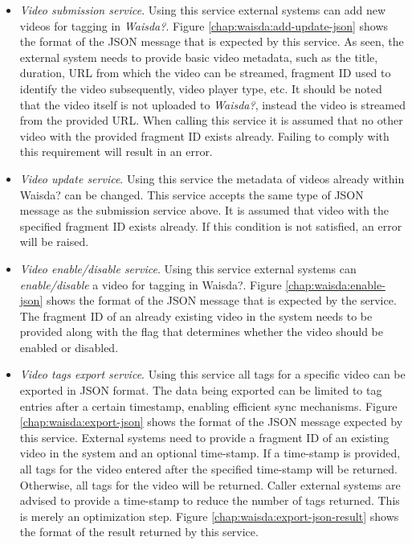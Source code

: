 \begin{itemize}
\item \textit{Video submission service}. Using this service external systems can add new videos for tagging in \textit{Waisda?}. Figure \ref{chap:waisda:add-update-json} shows the format of the JSON message that is expected by this service. As seen, the external system needs to provide basic video metadata, such as the title, duration, URL from which the video can be streamed, fragment ID used to identify the video subsequently, video player type, etc. It should be noted that the video itself is not uploaded to \textit{Waisda?}, instead the video is streamed from the provided URL. When calling this service it is assumed that no other video with the provided fragment ID exists already. Failing to comply with this requirement will result in an error.

\item \textit{Video update service}. Using this service the metadata of videos already within Waisda? can be changed. This service accepts the same type of JSON message as the submission service above. It is assumed that video with the specified fragment ID exists already. If this condition is not satisfied, an error will be raised.

\item \textit{Video enable/disable service}. Using this service external systems can \textit{enable/disable} a video for tagging in Waisda?. Figure \ref{chap:waisda:enable-json} shows the format of the JSON message that is expected by the service. The fragment ID of an already existing video in the system needs to be provided along with the flag that determines whether the video should be enabled or disabled.

\item \textit{Video tags export service}. Using this service all tags for a specific video can be exported in JSON format. The data being exported can be limited to tag entries after a certain timestamp, enabling efficient sync mechanisms. Figure \ref{chap:waisda:export-json} shows the format of the JSON message expected by this service. External systems need to provide a fragment ID of an existing video in the system and an optional time-stamp. If a time-stamp is provided, all tags for the video entered after the specified time-stamp will be returned. Otherwise, all tags for the video will be returned. Caller external systems are advised to provide a time-stamp to reduce the number of tags returned. This is merely an optimization step. Figure \ref{chap:waisda:export-json-result} shows the format of the result returned by this service.
\end{itemize}

